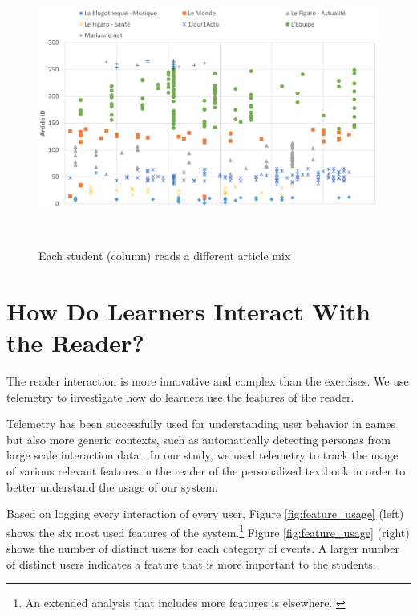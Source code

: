 \begin{figure}[h!]
\centering
  \includegraphics[width=\columnwidth]{figures/users_articles_color_png}
  \caption{Each student (column) reads a different article mix}~\label{fig:articles_read}
\end{figure}


\section{How Do Learners Interact With the Reader?}
\newcommand{\feature}[1]{{\em #1}}
The reader interaction is more innovative and complex than the exercises.
We use telemetry to investigate how do learners use the features of the reader. 

Telemetry has been successfully used for understanding user behavior in games \cite{Gagne11-telemetry} but also more generic contexts, such as automatically detecting personas from large scale interaction data \cite{Zhang16-telemetry}. In our study, we used telemetry to track the usage of various relevant features in the reader of the personalized textbook in order to better understand the usage of our system.

Based on logging every interaction of every user, Figure \ref{fig:feature_usage} (left) shows the six most used features of the system.\footnote{An extended analysis that includes more features is elsewhere. \cite{Chirtoaca17-apollo}} Figure \ref{fig:feature_usage} (right) shows the number of distinct users for each category of events. A larger number of distinct users indicates a feature that is more important to the students. 

